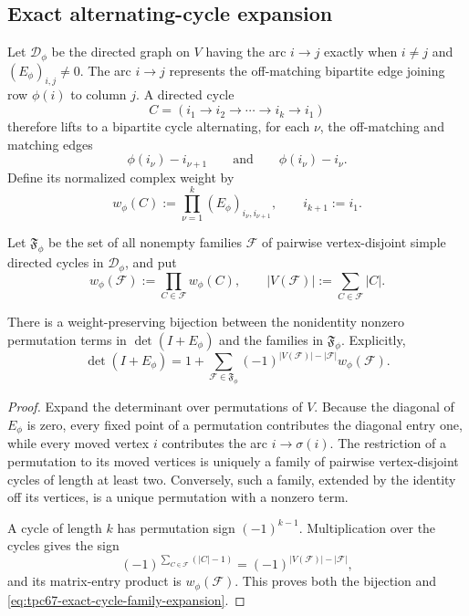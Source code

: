 \subsection{Exact alternating-cycle expansion}

Let \(\mathcal D_\phi\) be the directed graph on \(V\) having the arc
\(i\to j\) exactly when \(i\ne j\) and
\((E_\phi)_{i,j}\ne0\).  The arc \(i\to j\) represents the off-matching
bipartite edge joining row \(\phi(i)\) to column \(j\).  A directed cycle
\[
 C=(i_1\to i_2\to\cdots\to i_k\to i_1)
\]
therefore lifts to a bipartite cycle alternating, for each \(\nu\), the
off-matching and matching edges
\[
 \phi(i_\nu)\!-\!i_{\nu+1}
 \qquad\text{and}\qquad
 \phi(i_\nu)\!-\!i_\nu.
\]
Define its normalized complex weight by
\begin{equation}
 w_\phi(C)
 :=
 \prod_{\nu=1}^{k}(E_\phi)_{i_\nu,i_{\nu+1}},
 \qquad i_{k+1}:=i_1.
 \label{eq:tpc67-cycle-weight}
\end{equation}

Let \(\mathfrak F_\phi\) be the set of all nonempty families
\(\mathcal F\) of pairwise vertex-disjoint simple directed cycles in
\(\mathcal D_\phi\), and put
\[
 w_\phi(\mathcal F):=\prod_{C\in\mathcal F}w_\phi(C),
 \qquad
 |V(\mathcal F)|:=\sum_{C\in\mathcal F}|C|.
\]

\begin{theorem}
\label{thm:tpc67-cycle-family-expansion}
There is a weight-preserving bijection between the nonidentity nonzero
permutation terms in \(\det(I+E_\phi)\) and the families in
\(\mathfrak F_\phi\).  Explicitly,
\begin{equation}
 \boxed{
 \det(I+E_\phi)
 =
 1+
 \sum_{\mathcal F\in\mathfrak F_\phi}
 (-1)^{|V(\mathcal F)|-|\mathcal F|}
 w_\phi(\mathcal F).}
 \label{eq:tpc67-exact-cycle-family-expansion}
\end{equation}
\end{theorem}

\begin{proof}
Expand the determinant over permutations of \(V\).  Because the diagonal
of \(E_\phi\) is zero, every fixed point of a permutation contributes the
diagonal entry one, while every moved vertex \(i\) contributes the arc
\(i\to\sigma(i)\).  The restriction of a permutation to its moved vertices
is uniquely a family of pairwise vertex-disjoint cycles of length at least
two.  Conversely, such a family, extended by the identity off its vertices,
is a unique permutation with a nonzero term.

A cycle of length \(k\) has permutation sign \((-1)^{k-1}\).
Multiplication over the cycles gives the sign
\[
 (-1)^{\sum_{C\in\mathcal F}(|C|-1)}
 =
 (-1)^{|V(\mathcal F)|-|\mathcal F|},
\]
and its matrix-entry product is \(w_\phi(\mathcal F)\).  This proves both
the bijection and \eqref{eq:tpc67-exact-cycle-family-expansion}.
\end{proof}

